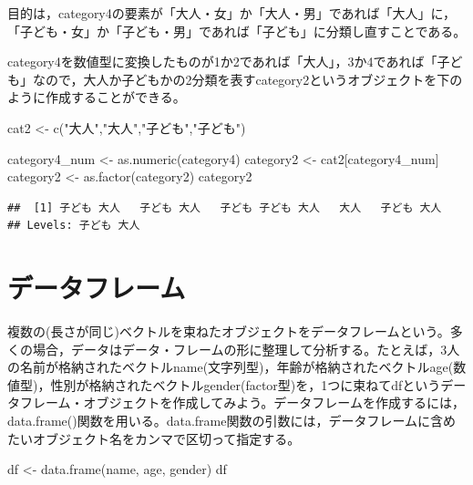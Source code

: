 \documentclass[
]{book}
\newenvironment{Shaded}{\begin{snugshade}}{\end{snugshade}}
\newcommand{\FunctionTok}[1]{\textcolor[rgb]{0.00,0.00,0.00}{#1}}
\newcommand{\NormalTok}[1]{#1}
\newcommand{\OtherTok}[1]{\textcolor[rgb]{0.56,0.35,0.01}{#1}}
\newcommand{\StringTok}[1]{\textcolor[rgb]{0.31,0.60,0.02}{#1}}
\begin{document}
目的は，category4の要素が「大人・女」か「大人・男」であれば「大人」に，「子ども・女」か「子ども・男」であれば「子ども」に分類し直すことである。

category4を数値型に変換したものが1か2であれば「大人」，3か4であれば「子ども」なので，大人か子どもかの2分類を表すcategory2というオブジェクトを下のように作成することができる。

\begin{Shaded}
\begin{Highlighting}[]
\NormalTok{cat2 }\OtherTok{\textless{}{-}} \FunctionTok{c}\NormalTok{(}\StringTok{"大人"}\NormalTok{,}\StringTok{"大人"}\NormalTok{,}\StringTok{"子ども"}\NormalTok{,}\StringTok{"子ども"}\NormalTok{)}

\NormalTok{category4\_num }\OtherTok{\textless{}{-}} \FunctionTok{as.numeric}\NormalTok{(category4)}
\NormalTok{category2 }\OtherTok{\textless{}{-}}\NormalTok{ cat2[category4\_num]}
\NormalTok{category2 }\OtherTok{\textless{}{-}} \FunctionTok{as.factor}\NormalTok{(category2)}
\NormalTok{category2}
\end{Highlighting}
\end{Shaded}

\begin{verbatim}
##  [1] 子ども 大人   子ども 大人   子ども 子ども 大人   大人   子ども 大人  
## Levels: 子ども 大人
\end{verbatim}

\hypertarget{ux30c7ux30fcux30bfux30d5ux30ecux30fcux30e0}{%
\section{データフレーム}\label{ux30c7ux30fcux30bfux30d5ux30ecux30fcux30e0}}

複数の(長さが同じ)ベクトルを束ねたオブジェクトをデータフレームという。多くの場合，データはデータ・フレームの形に整理して分析する。たとえば，3人の名前が格納されたベクトルname(文字列型)，年齢が格納されたベクトルage(数値型)，性別が格納されたベクトルgender(factor型)を，1つに束ねてdfというデータフレーム・オブジェクトを作成してみよう。データフレームを作成するには，data.frame()関数を用いる。data.frame関数の引数には，データフレームに含めたいオブジェクト名をカンマで区切って指定する。

\begin{Shaded}
\begin{Highlighting}[]
\NormalTok{df }\OtherTok{\textless{}{-}} \FunctionTok{data.frame}\NormalTok{(name, age, gender)}
\NormalTok{df}
\end{Highlighting}
\end{Shaded}
\end{document}
